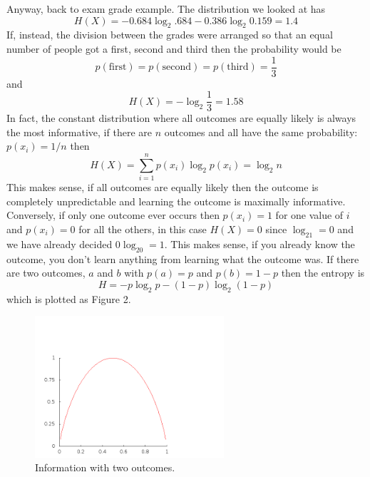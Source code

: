 \documentclass[11pt,a4paper]{scrartcl}
\begin{document}
Anyway, back to exam grade example. The distribution we looked at has
\begin{equation}
H(X)=-0.684\log_2{.684}-0.386\log_2{0.159}=1.4
\end{equation}
If, instead, the division between the grades were arranged so that an equal number of people got a first, second and third then the probability would be 
\begin{equation}
p(\mbox{first})=p(\mbox{second})=p(\mbox{third})=\frac{1}{3}
\end{equation}
and
\begin{equation}
H(X)=-\log_2\frac{1}{3}=1.58
\end{equation}
In fact, the constant distribution where all outcomes are equally
likely is always the most informative, if there are $n$ outcomes and all have the same probability: $p(x_i)=1/n$ then
\begin{equation}
H(X)=\sum_{i=1}^np(x_i)\log_2{p(x_i)}=\log_2{n}
\end{equation}
This makes sense, if all outcomes are equally likely then the outcome
is completely unpredictable and learning the outcome is maximally
informative. Conversely, if only one outcome ever occurs then
$p(x_i)=1$ for one value of $i$ and $p(x_i)=0$ for all the others, in
this case $H(X)=0$ since $\log_21=0$ and we have already decided
$0\log_20=1$. This makes sense, if you already know the outcome, you
don't learn anything from learning what the outcome was. If there are
two outcomes, $a$ and $b$ with $p(a)=p$ and $p(b)=1-p$ then the entropy is
\begin{equation}
H=-p\log_2{p}-(1-p)\log_2{(1-p)}
\end{equation}
which is plotted as Figure 2.

\begin{figure}
\begin{center}
\includegraphics[width=7cm]{info_one_d.png}
\end{center}
\caption{Information with two outcomes.}
\end{figure}
\end{document}
